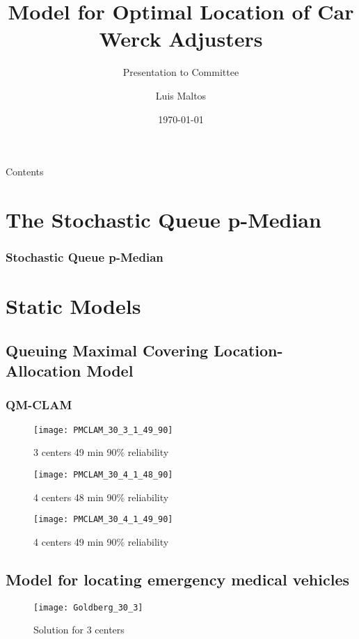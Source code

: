 \documentclass[10pt,usenames,dvipsnames,svgnames,table]{beamer}
\title{Model for Optimal Location of Car Werck Adjusters}
\subtitle{Presentation to Committee}
\author{Luis Maltos}
\institute[PISIS]{
  Posgrado en Ingenier\'a de Sistemas \\
  FIME / UANL}
\date[Sinodales]{\today}
\begin{document}
\begin{frame}
  \titlepage
\end{frame}

\begin{frame}{Contents}
  \tableofcontents
\end{frame}

\section{The Stochastic Queue p-Median}
\begin{frame}[allowframebreaks]  \frametitle{Stochastic Queue p-Median}
  
\end{frame}

\section{Static Models}
\subsection{Queuing Maximal Covering Location-Allocation Model}
\begin{frame}[allowframebreaks]
  \frametitle{QM-CLAM}
  
  \begin{figure}[htbp]
    \centering
    \texttt{[image: PMCLAM\_30\_3\_1\_49\_90]}
    \caption{3 centers 49 min 90\% reliability}
  \end{figure}
  \begin{figure}[htbp]
    \centering
    \texttt{[image: PMCLAM\_30\_4\_1\_48\_90]}
    \caption{4 centers 48 min 90\% reliability}
  \end{figure}
  \begin{figure}[htbp]
    \centering
    \texttt{[image: PMCLAM\_30\_4\_1\_49\_90]}
    \caption{4 centers 49 min 90\% reliability}
  \end{figure}
\end{frame}

\subsection{Model for locating emergency medical vehicles}
\begin{frame}[allowframebreaks]
  
  \begin{figure}[htbp]
    \centering
    \texttt{[image: Goldberg\_30\_3]}
    \caption{Solution for 3 centers}
  \end{figure}
\end{frame}
\end{document}
